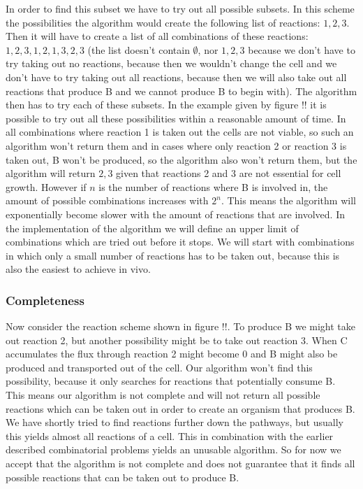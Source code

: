 \documentclass[12pt]{report}
\begin{document}
In order to find this subset we have to try out all possible subsets. In this scheme the possibilities the algorithm would create the following list of reactions: ${1, 2, 3}$.
Then it will have to create a list of all combinations of these reactions: ${{1},{2},{3},{1,2},{1,3},{2,3}}$ (the list doesn't contain $\emptyset$, nor ${1,2,3}$ because we don't have to try taking out no reactions, because then we wouldn't change the cell and we don't have to try taking out all reactions, because then we will also take out all reactions that produce B and we cannot produce B to begin with).
The algorithm then has to try each of these subsets.
In the example given by figure !! it is possible to try out all these possibilities within a reasonable amount of time.
In all combinations where reaction 1 is taken out the cells are not viable, so such an algorithm won't return them and in cases where only reaction 2 or reaction 3 is taken out, B won't be produced, so the algorithm also won't return them, but the algorithm will return ${2,3}$ given that reactions 2 and 3 are not essential for cell growth.
However if $n$ is the number of reactions where B is involved in, the amount of possible combinations increases with $2^n$.
This means the algorithm will exponentially become slower with the amount of reactions that are involved.
In the implementation of the algorithm we will define an upper limit of combinations which are tried out before it stops. We will start with combinations in which only a small number of reactions has to be taken out, because this is also the easiest to achieve in vivo.

\subsubsection{Completeness}
Now consider the reaction scheme shown in figure !!.
To produce B we might take out reaction 2, but another possibility might be to take out reaction 3.
When C accumulates the flux through reaction 2 might become 0 and B might also be produced and transported out of the cell.
Our algorithm won't find this possibility, because it only searches for reactions that potentially consume B.
This means our algorithm is not complete and will not return all possible reactions which can be taken out in order to create an organism that produces B.
We have shortly tried to find reactions further down the pathways, but usually this yields almost all reactions of a cell.
This in combination with the earlier described combinatorial problems yields an unusable algorithm.
So for now we accept that the algorithm is not complete and does not guarantee that it finds all possible reactions that can be taken out to produce B.
\end{document}
